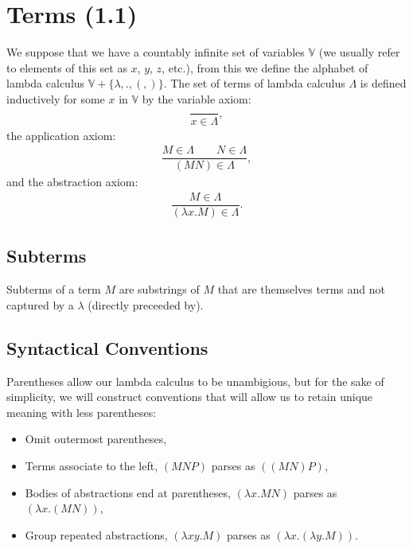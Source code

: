 \section{Terms (1.1)}

We suppose that we have a countably infinite set of variables $\mathbb{V}$
(we usually refer to elements of this set as $x$, $y$, $z$, etc.),
from this we define the alphabet of lambda calculus 
$\mathbb{V} + \{\lambda, ., (, )\}$. 
The set of terms of lambda calculus $\Lambda$ is defined inductively 
for some $x$ in $\mathbb{V}$ by the variable axiom: \begin{align*}
    \dfrac{}{x \in \Lambda},
\end{align*} the application axiom: \begin{align*}
    \dfrac{M \in \Lambda \qquad N \in \Lambda}{(MN) \in \Lambda},
\end{align*} and the abstraction axiom: \begin{align*}
    \dfrac{M \in \Lambda}{(\lambda x.M) \in \Lambda}.
\end{align*}

\subsection{Subterms}

Subterms of a term $M$ are substrings of $M$ that are themselves terms and
not captured by a $\lambda$ (directly preceeded by).

\subsection{Syntactical Conventions}

Parentheses allow our lambda calculus to be unambigious, but for the sake
of simplicity, we will construct conventions that will allow us to retain
unique meaning with less parentheses: \begin{itemize}
    \item Omit outermost parentheses,
    \item Terms associate to the left, $(MNP)$ parses as $((MN)P)$,
    \item Bodies of abstractions end at parentheses, $(\lambda x.MN)$
        parses as $(\lambda x.(MN))$,
    \item Group repeated abstractions, $(\lambda xy.M)$ 
        parses as $(\lambda x.(\lambda y.M))$.
\end{itemize}